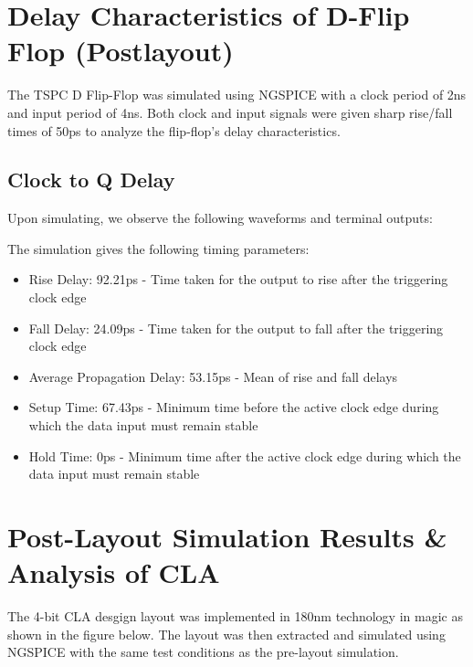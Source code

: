 \documentclass[conference]{IEEEtran}
\begin{document}
\section{Delay Characteristics of D-Flip Flop (Postlayout)}
The TSPC D Flip-Flop was simulated using NGSPICE with a clock period of 2ns and input period of 4ns. Both clock and input signals were given sharp rise/fall times of 50ps to analyze the flip-flop's delay characteristics.

\subsection{Clock to Q Delay }
Upon simulating, we observe the following waveforms and terminal outputs:



The simulation gives the following timing parameters:
\begin{itemize}
    \item Rise Delay: 92.21ps - Time taken for the output to rise after the triggering clock edge
    \item Fall Delay: 24.09ps - Time taken for the output to fall after the triggering clock edge  
    \item Average Propagation Delay: 53.15ps - Mean of rise and fall delays
    \item Setup Time: 67.43ps - Minimum time before the active clock edge during which the data input must remain stable
    \item Hold Time: 0ps - Minimum time after the active clock edge during which the data input must remain stable
\end{itemize}


\section{Post-Layout Simulation Results \& Analysis of CLA}
The 4-bit CLA desgign layout was implemented in 180nm technology in magic as shown in the figure below. The layout was then extracted and simulated using NGSPICE with the same test conditions as the pre-layout simulation.
\end{document}
